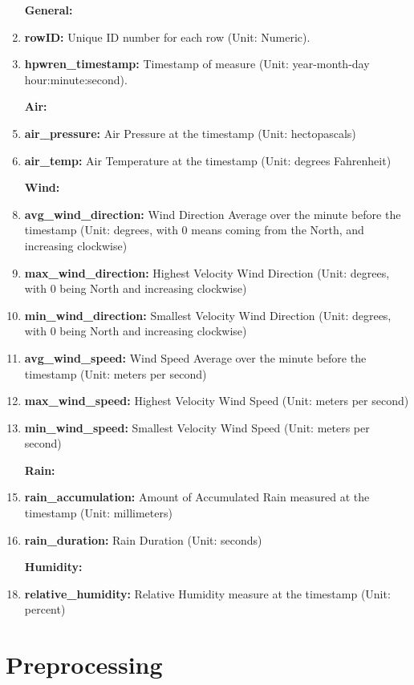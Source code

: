 \documentclass{book}
\begin{document}
    \begin{enumerate}
        \item [\textbf{General:}]
        \item \textbf{rowID:} Unique ID number for each row (Unit: Numeric).
        \item \textbf{hpwren\_timestamp:} Timestamp of measure (Unit: year-month-day hour:minute:second).
        \item [\textbf{Air:}]
        \item \textbf{air\_pressure:} Air Pressure at the timestamp (Unit: hectopascals)
        \item \textbf{air\_temp:} Air Temperature at the timestamp (Unit: degrees Fahrenheit)
        \item [\textbf{Wind:}]
        \item \textbf{avg\_wind\_direction:} Wind Direction Average over the minute before the timestamp (Unit: degrees, with 0 means coming from the North, and increasing clockwise) 
        \item \textbf{max\_wind\_direction:} Highest Velocity Wind Direction (Unit: degrees, with 0 being North and increasing clockwise) 
        \item \textbf{min\_wind\_direction:} Smallest Velocity Wind Direction (Unit: degrees, with 0 being North and increasing clockwise) 
        \item \textbf{avg\_wind\_speed:} Wind Speed Average over the minute before the timestamp (Unit: meters per second)
        \item \textbf{max\_wind\_speed:} Highest Velocity Wind Speed (Unit: meters per second) 
        \item \textbf{min\_wind\_speed:} Smallest Velocity Wind Speed (Unit: meters per second) 
        \item [\textbf{Rain:}]
        \item \textbf{rain\_accumulation:} Amount of Accumulated Rain measured at the timestamp (Unit: millimeters) 
        \item \textbf{rain\_duration:} Rain Duration (Unit: seconds) 
        \item [\textbf{Humidity:}]
        \item \textbf{relative\_humidity:} Relative Humidity measure at the timestamp (Unit: percent) 
    \end{enumerate}

    \section{Preprocessing}
\end{document}
